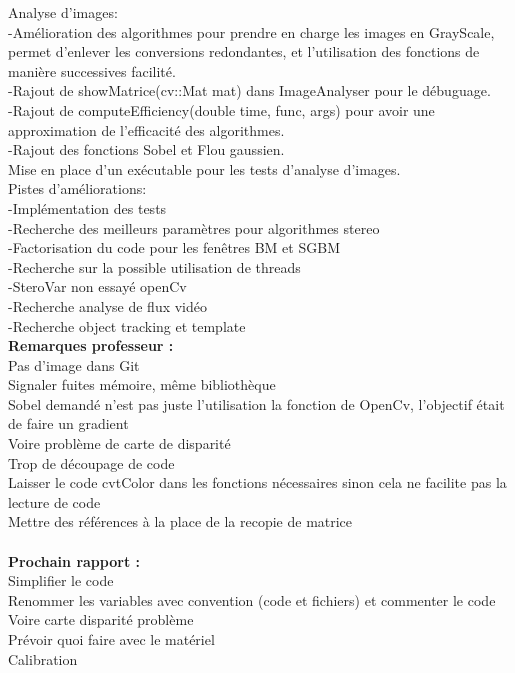 \documentclass{article}
\begin{document}
Analyse d'images:\\
	-Amélioration des algorithmes pour prendre en charge les images en GrayScale, permet d'enlever les conversions redondantes, et l'utilisation des fonctions de manière successives facilité.\\
	-Rajout de showMatrice(cv::Mat mat) dans ImageAnalyser pour le débuguage.\\
	-Rajout de computeEfficiency(double time, func, args) pour avoir une approximation de l'efficacité des algorithmes.\\
	-Rajout des fonctions Sobel et Flou gaussien.\\

Mise en place d'un exécutable pour les tests d'analyse d'images.\\

Pistes d'améliorations:\\
	-Implémentation des tests\\
	-Recherche des meilleurs paramètres pour algorithmes stereo\\
	-Factorisation du code pour les fenêtres BM et SGBM\\
	-Recherche sur la possible utilisation de threads\\
	-SteroVar non essayé openCv\\
	-Recherche analyse de flux vidéo\\
	-Recherche object tracking et template
\\

\textbf{Remarques professeur :}\\
Pas d'image dans Git\\
Signaler fuites mémoire, même bibliothèque\\
Sobel demandé n'est pas juste l'utilisation la fonction de OpenCv, l'objectif était de faire un gradient\\
Voire problème de carte de disparité\\
Trop de découpage  de code\\
Laisser le code cvtColor dans les fonctions nécessaires sinon cela ne facilite pas la lecture de code\\
Mettre des références à la place de la recopie de matrice
\\\\

\textbf{Prochain rapport :}\\
Simplifier le code\\
Renommer les variables avec convention (code et fichiers) et commenter le code\\
Voire carte disparité problème\\
Prévoir quoi faire avec le matériel\\
Calibration\\
\\
\end{document}
